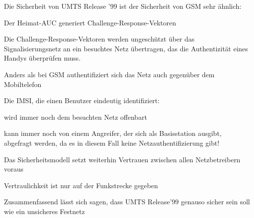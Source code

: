 \documentclass[a4paper]{article}
\begin{document}
\begin{multicols}{3}
      \begin{itemize*}
            \item Die Sicherheit von UMTS Release '99 ist der Sicherheit von GSM sehr
            ähnlich:
            \begin{itemize*}
                  \item Der Heimat-AUC generiert Challenge-Response-Vektoren
                  \item Die Challenge-Response-Vektoren werden ungeschützt über das Signalisierungsnetz an ein besuchtes Netz übertragen, das die Authentizität eines Handys überprüfen muss.
                  \item Anders als bei GSM authentifiziert sich das Netz auch gegenüber dem Mobiltelefon
                  \item Die IMSI, die einen Benutzer eindeutig identifiziert:
                  \begin{itemize*}
                        \item wird immer noch dem besuchten Netz offenbart
                        \item kann immer noch von einem Angreifer, der sich als Basisstation ausgibt, abgefragt werden, da es in diesem Fall keine Netzauthentifizierung gibt!
                  \end{itemize*}
                  \item Das Sicherheitsmodell setzt weiterhin Vertrauen zwischen allen Netzbetreibern voraus
                  \item Vertraulichkeit ist nur auf der Funkstrecke gegeben
            \end{itemize*}
            \item Zusammenfassend lässt sich sagen, dass UMTS Release'99 genauso sicher
            sein soll wie ein unsicheres Festnetz
      \end{itemize*}



\end{multicols}
\end{document}
